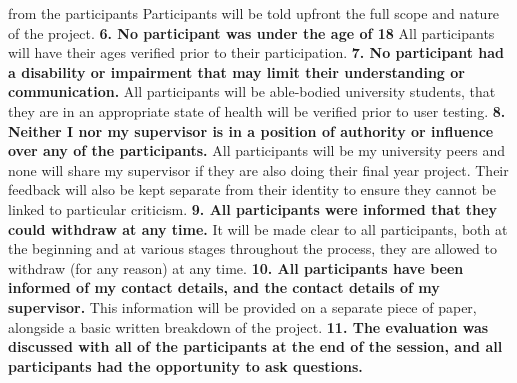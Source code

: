 \documentclass{report}
\begin{document}
\begin{raggedright}
{from the participants}
\newline
\newline
Participants will be told upfront the full scope and nature of the project.
\newline
\newline
\textbf{6. No participant was under the age of 18}
\newline
\newline
All participants will have their ages verified prior to their participation.
\newline
\newline
\textbf{7. No participant had a disability or impairment that may limit their understanding
or communication.}
\newline
\newline
All participants will be able-bodied university students, that they are in an appropriate state of health will be verified prior to user testing.
\newline
\newline
\textbf{8. Neither I nor my supervisor is in a position of authority or influence over any of
the participants.}
\newline
\newline
All participants will be my university peers and none will share my supervisor if they are also doing their final year project. Their feedback will also be kept separate from their identity to ensure they cannot be linked to particular criticism.
\newline
\newline
\textbf{9. All participants were informed that they could withdraw at any time.}
\newline
\newline
It will be made clear to all participants, both at the beginning and at various stages throughout the process, they are allowed to withdraw (for any reason) at any time.
\newline
\newline
\textbf{10. All participants have been informed of my contact details, and the contact details
of my supervisor.}
\newline
\newline
This information will be provided on a separate piece of paper, alongside a basic written breakdown of the project.
\newline
\newline
\textbf{11. The evaluation was discussed with all of the participants at the end of the
session, and all participants had the opportunity to ask questions.}

\end{raggedright}
\end{document}
